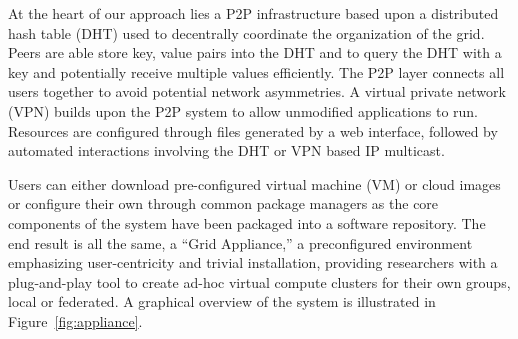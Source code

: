 \documentclass[conference]{IEEEtran}
\begin{document}
At the heart of our approach lies a P2P infrastructure based upon a distributed
hash table (DHT) used to decentrally coordinate the organization of the grid.
Peers are able store key, value pairs into the DHT and to query the DHT with a
key and potentially receive multiple values efficiently.  The P2P layer
connects all users together to avoid potential network asymmetries.  A virtual
private network (VPN) builds upon the P2P system to allow unmodified
applications to run.  Resources are configured through files generated by a web
interface, followed by automated interactions involving the DHT or VPN based IP
multicast.  

Users can either download pre-configured virtual machine (VM) or cloud images
or configure their own through common package managers as the core components
of the system have been packaged into a software repository.  The end result is
all the same, a ``Grid Appliance,'' a preconfigured environment emphasizing
user-centricity and trivial installation, providing researchers with a
plug-and-play tool to create ad-hoc virtual compute clusters for their own
groups, local or federated.  A graphical overview of the system is illustrated
in Figure~\ref{fig:appliance}.
\end{document}
